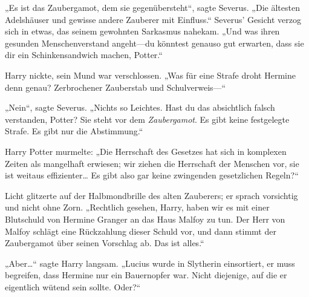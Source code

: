 „Es ist das Zaubergamot, dem sie gegenübersteht“, sagte Severus. „Die ältesten Adelshäuser und gewisse andere Zauberer mit Einfluss.“
Severus' Gesicht verzog sich in etwas, das seinem gewohnten Sarkasmus nahekam. „Und was ihren gesunden Menschenverstand angeht—du könntest genauso gut erwarten, dass sie dir ein Schinkensandwich machen, Potter.“

Harry nickte, sein Mund war verschlossen.
„Was für eine Strafe droht Hermine denn genau? Zerbrochener Zauberstab und Schulverweis—“

„Nein“, sagte Severus. „Nichts so Leichtes. Hast du das absichtlich falsch verstanden, Potter? Sie steht vor dem \emph{Zaubergamot}. Es gibt keine festgelegte Strafe. Es gibt nur die Abstimmung.“

Harry Potter murmelte: „Die Herrschaft des Gesetzes hat sich in komplexen Zeiten als mangelhaft erwiesen; wir ziehen die Herrschaft der Menschen vor, sie ist weitaus effizienter… Es gibt also gar keine zwingenden gesetzlichen Regeln?“

Licht glitzerte auf der Halbmondbrille des alten Zauberers; er sprach vorsichtig und nicht ohne Zorn. „Rechtlich gesehen, Harry, haben wir es mit einer Blutschuld von Hermine Granger an das Haus Malfoy zu tun. Der Herr von Malfoy schlägt eine Rückzahlung dieser Schuld vor, und dann stimmt der Zaubergamot über seinen Vorschlag ab. Das ist alles.“

„Aber…“ sagte Harry langsam. „Lucius wurde in Slytherin einsortiert, er muss begreifen, dass Hermine nur ein Bauernopfer war. Nicht diejenige, auf die er eigentlich wütend sein sollte. Oder?“

